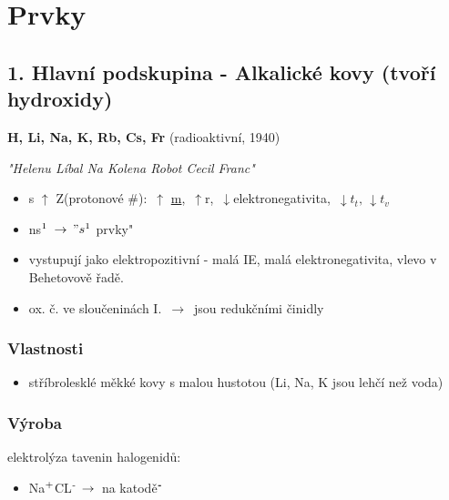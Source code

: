 \documentclass{article}
\def\SP#1{\textsuperscript{#1}}
\begin{document}
\section{Prvky}
\subsection{1. Hlavní podskupina - Alkalické kovy (tvoří hydroxidy)}
\textbf{H, Li, Na, K, Rb, Cs, Fr} (radioaktivní, 1940)

\textit{"Helenu Líbal Na Kolena Robot Cecil Franc"}
    \begin{itemize}
        \item s $\uparrow$ Z(protonové \#): $\, \uparrow$ \underline{m}, $\, \uparrow$r, $\, \downarrow$elektronegativita, $\, \downarrow t_t, \, \downarrow t_v$
        \item ns$\SP{1}$ \fbox{$\downarrow$} $\,\to\, "s\SP{1}$ prvky"
        
        \item vystupují jako elektropozitivní - malá IE, malá elektronegativita, vlevo v Behetovově řadě.
        \item ox. č. ve sloučeninách I. $\,\to\,$ jsou redukčními činidly
    \end{itemize}
    \subsubsection{Vlastnosti}
        \begin{itemize}
            \item stříbrolesklé měkké kovy s malou hustotou (Li, Na, K jsou lehčí než voda)
        \end{itemize}
    \subsubsection{Výroba}
        elektrolýza tavenin halogenidů:
        \begin{itemize}
            \item Na$\SP{+}$CL$\SP{-}\,\to\,$ na katodě$\SP{\textbf{-}}$
        \end{itemize}
\end{document}
